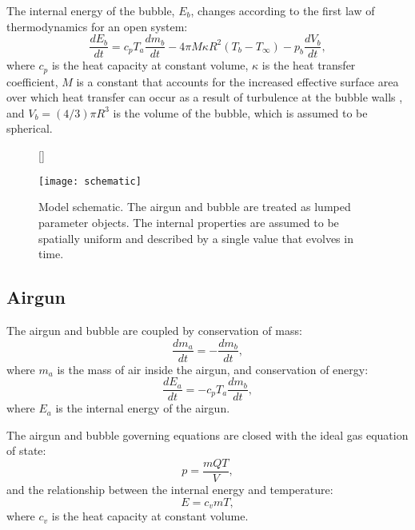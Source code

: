\documentclass[10pt]{article}
\begin{document}
The internal energy of the bubble, $E_b$, changes according to the first law of thermodynamics for an open system:
\begin{equation}
\frac{dE_b}{dt} = c_p T_a \frac{dm_b}{dt} - 4 \pi M \kappa R^2 (T_b - T_\infty) - p_b \frac{dV_b}{dt},
\end{equation}
where $c_p$ is the heat capacity at constant volume, $\kappa$ is the heat transfer coefficient, $M$ is a constant that accounts for the increased effective surface area over which heat transfer can occur as a result of turbulence at the bubble walls \citep{Laws1990}, and $V_b = (4/3) \pi R^3$ is the volume of the bubble, which is assumed to be spherical.

\begin{figure}[t!]
\centering
{}[\FBwidth]
{\caption{Model schematic. The airgun and bubble are treated as lumped parameter objects. The internal properties are assumed to be spatially uniform and described by a single value that evolves in time. }
\label{fig:schematic}}
{\texttt{[image: schematic]}}
\end{figure}

\subsection{Airgun}
The airgun and bubble are coupled by conservation of mass:
\begin{equation}
\frac{dm_a}{dt} = -\frac{dm_b}{dt},
\end{equation}
where $m_a$ is the mass of air inside the airgun, and conservation of energy:
\begin{equation}
\frac{dE_a}{dt} = -c_p T_a \frac{dm_b}{dt},
\end{equation}
where $E_a$ is the internal energy of the airgun. 

The airgun and bubble governing equations are closed with the ideal gas equation of state:
\begin{equation}
p = \frac{mQT}{V},
\label{eq:ideal gas law}
\end{equation}
and the relationship between the internal energy and temperature:
\begin{equation}
E = c_v m T,
\end{equation}
where $c_v$ is the heat capacity at constant volume. 
\end{document}
